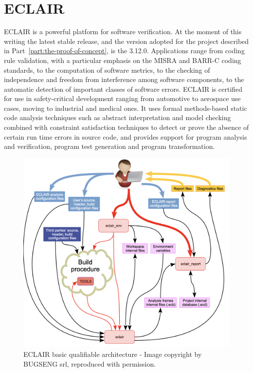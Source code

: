 \chapter{ECLAIR}\label{chapter:eclair}
ECLAIR is a powerful platform for software verification. At the moment of this writing the latest stable release, and the version adopted for the project described in Part~\ref{part:the-proof-of-concept}, is the 3.12.0.
Applications range from coding rule validation, with a particular emphasis on the MISRA and BARR-C coding standards, to the computation of software metrics, to the checking of independence and freedom from interference among software components, to the automatic detection of important classes of software errors.
ECLAIR is certified for use in safety-critical development ranging from automotive to aerospace use cases, moving to industrial and medical ones.
It uses formal methods-based static code analysis techniques such as abstract interpretation and model checking combined with constraint satisfaction techniques to detect or prove the absence of certain run time errors in source code, and provides support for program analysis and verification, program test generation and program transformation.

\begin{figure}[ht]
	\centering
	\includegraphics[width=1.0\textwidth]{Immagini/ECLAIR_basic_qualifiable_architecture.jpg}
	\caption{ECLAIR basic qualifiable architecture - Image copyright by BUGSENG srl, reproduced with permission.}
	\label{fig:one}
\end{figure}

